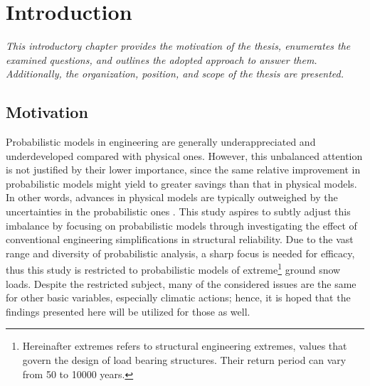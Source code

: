 
\chapter{Introduction}  %
\label{cha:intro}

\ifpdf
    \graphicspath{{Chapter1/Figs/Raster/}{Chapter1/Figs/PDF/}{Chapter1/Figs/}}
\else
    \graphicspath{{Chapter1/Figs/Vector/}{Chapter1/Figs/}}
\fi

\leftskip=1cm
\noindent
\emph{This introductory chapter provides the motivation of the thesis, enumerates the examined questions, and outlines the adopted approach to answer them. Additionally, the organization, position, and scope of the thesis are presented.}

\leftskip=0pt\rightskip=0pt

\section{Motivation} %

Probabilistic models in engineering are generally underappreciated and underdeveloped compared with physical ones. However, this unbalanced attention is not justified by their lower importance, since the same relative improvement in probabilistic models might yield to greater savings than that in physical models.  In other words, advances in physical models are typically outweighed by the uncertainties in the probabilistic ones \citep{Mcrobie2004}. This study aspires to subtly adjust this imbalance by focusing on probabilistic models through investigating the effect of conventional engineering simplifications in structural reliability. Due to the vast range and diversity of probabilistic analysis, a sharp focus is needed for efficacy, thus this study is restricted to probabilistic models of extreme\footnote{Hereinafter extremes refers to structural engineering extremes, values that govern the design of load bearing structures. Their return period can vary from 50 to 10000 years.} ground snow loads. Despite the restricted subject, many of the considered issues are the same for other basic variables, especially climatic actions; hence, it is hoped that the findings presented here will be utilized for those as well.

